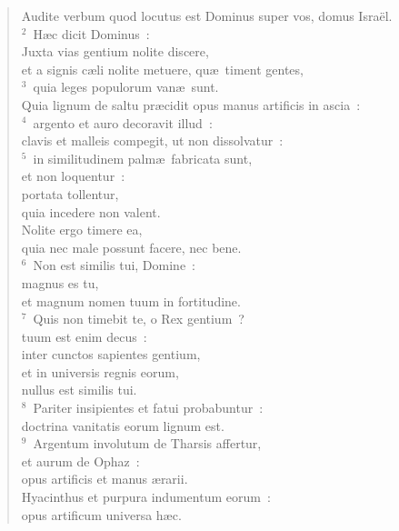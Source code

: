 \begin{flushleft}\begin{verse}\vspace{-19pt}\hspace{6pt}Audite verbum quod locutus est Dominus super vos, domus Isra\"el.\\\hspace{6pt}
${}^{2}$~H\ae c dicit Dominus~:\\ Juxta vias gentium nolite discere,\\ et a signis c\ae li nolite metuere, qu\ae\ timent gentes,\\
${}^{3}$~quia leges populorum van\ae\ sunt.\\ Quia lignum de saltu pr\ae cidit opus manus artificis in ascia~:\\
${}^{4}$~argento et auro decoravit illud~:\\ clavis et malleis compegit, ut non dissolvatur~:\\
${}^{5}$~in similitudinem palm\ae\ fabricata sunt,\\ et non loquentur~:\\ portata tollentur,\\ quia incedere non valent.\\ Nolite ergo timere ea,\\ quia nec male possunt facere, nec bene.\\
${}^{6}$~Non est similis tui, Domine~:\\ magnus es tu,\\ et magnum nomen tuum in fortitudine.\\
${}^{7}$~Quis non timebit te, o Rex gentium~?\\ tuum est enim decus~:\\ inter cunctos sapientes gentium,\\ et in universis regnis eorum,\\ nullus est similis tui.\\
${}^{8}$~Pariter insipientes et fatui probabuntur~:\\ doctrina vanitatis eorum lignum est.\\
${}^{9}$~Argentum involutum de Tharsis affertur,\\ et aurum de Ophaz~:\\ opus artificis et manus \ae rarii.\\ Hyacinthus et purpura indumentum eorum~:\\ opus artificum universa h\ae c.\\

\end{verse}
\end{flushleft}
